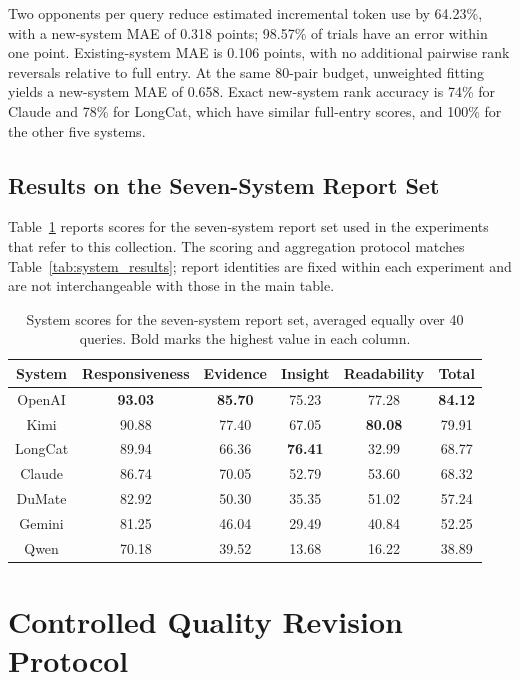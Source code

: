 \documentclass{article}
\begin{document}
Two opponents per query reduce estimated incremental token use by 64.23\%, with a new-system MAE of 0.318 points; 98.57\% of trials have an error within one point. Existing-system MAE is 0.106 points, with no additional pairwise rank reversals relative to full entry. At the same 80-pair budget, unweighted fitting yields a new-system MAE of 0.658. Exact new-system rank accuracy is 74\% for Claude and 78\% for LongCat, which have similar full-entry scores, and 100\% for the other five systems.

\subsection{Results on the Seven-System Report Set}
\label{app:initial_reports}
Table~\ref{tab:initial_system_results} reports scores for the seven-system report set used in the experiments that refer to this collection. The scoring and aggregation protocol matches Table~\ref{tab:system_results}; report identities are fixed within each experiment and are not interchangeable with those in the main table.
\begin{table}[t]
\centering\small\setlength{\tabcolsep}{4pt}\begin{tabular}{@{}cccccc@{}}\toprule System & Responsiveness & Evidence & Insight & Readability & Total \\ \midrule OpenAI & \textbf{93.03} & \textbf{85.70} & 75.23 & 77.28 & \textbf{84.12} \\ Kimi & 90.88 & 77.40 & 67.05 & \textbf{80.08} & 79.91 \\ LongCat & 89.94 & 66.36 & \textbf{76.41} & 32.99 & 68.77 \\ Claude & 86.74 & 70.05 & 52.79 & 53.60 & 68.32 \\ DuMate & 82.92 & 50.30 & 35.35 & 51.02 & 57.24 \\ Gemini & 81.25 & 46.04 & 29.49 & 40.84 & 52.25 \\ Qwen & 70.18 & 39.52 & 13.68 & 16.22 & 38.89 \\ \bottomrule\end{tabular}
\caption{System scores for the seven-system report set, averaged equally over 40 queries. Bold marks the highest value in each column.}
\label{tab:initial_system_results}
\end{table}

\section{Controlled Quality Revision Protocol}
\label{app:controlled_changes}
\end{document}

